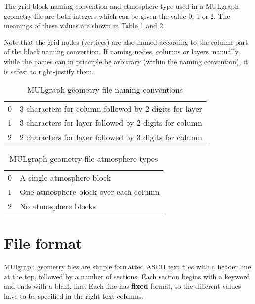 The grid block naming convention and atmosphere type used in a MULgraph geometry file are both integers which can be given the value 0, 1 or 2.  The meanings of these values are shown in Table \ref{tb:mulgrid_conventions} and \ref{tb:mulgrid_atmosphere_types}.

Note that the grid nodes (vertices) are also named according to the column part of the block naming convention. If naming nodes, columns or layers manually, while the names can in principle be arbitrary (within the naming convention), it is safest to right-justify them.

\begin{table}[h]
  \begin{center}
    \begin{tabular}{|l|p{85mm}|}
      \hline
      0 & 3 characters for column followed by 2 digits for layer \\
      1 & 3 characters for layer followed by 2 digits for column \\
      2 & 2 characters for layer followed by 3 digits for column \\
      \hline
    \end{tabular}
    \caption{MULgraph geometry file naming conventions}
    \label{tb:mulgrid_conventions}
  \end{center}
\end{table}

\begin{table}[h]
  \begin{center}
    \begin{tabular}{|l|p{85mm}|}
      \hline
      0 & A single atmosphere block \\
      1 & One atmosphere block over each column \\
      2 & No atmosphere blocks \\
      \hline
    \end{tabular}
    \caption{MULgraph geometry file atmosphere types}
    \label{tb:mulgrid_atmosphere_types}
  \end{center}
\end{table}

\section{File format}
MUlgraph geometry files are simple formatted ASCII text files with a header line at the top, followed by a number of sections. Each section begins with a keyword and ends with a blank line. Each line has \textbf{fixed} format, so the different values have to be specified in the right text columns.

